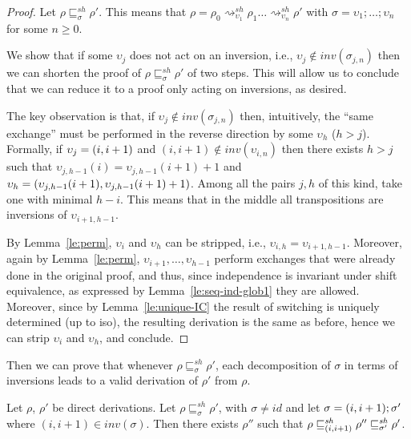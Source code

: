 \documentclass{llncs}
\newcommand{\perm}{\sigma}
\newcommand{\inv}[1]{\ensuremath{inv}({#1})}
\newcommand{\shiftdir}[1][]{\ensuremath{\mathrel{{\rightsquigarrow}^{\mathit{sh}}_{#1}}}}
\newcommand{\shiftpre}[1][]{\ensuremath{\mathrel{{\sqsubseteq}^{\mathit{sh}}_{#1}}}}
\begin{document}
\begin{proof}
  Let $\rho \shiftpre[\perm] \rho'$. This means that
  $\rho = \rho_0 \shiftdir[\upsilon_1] \rho_1 \ldots \shiftdir[\upsilon_n ]
  \rho'$ with $\perm = \upsilon_1; \ldots; \upsilon_n$ for some $n \geq 0$.
  
  We show that if some $\upsilon_j$ does not act on an inversion, i.e.,
  $\upsilon_j \not\in \inv{\sigma_{j,n}}$ then we can shorten the
  proof of $\rho \shiftpre[\sigma] \rho'$ of two steps. This will
  allow us to conclude that we can reduce it to a proof only acting
  on inversions, as desired.

  The key observation is that, if
  $\upsilon_j \not\in \inv{\sigma_{j,n}}$ then, intuitively, the ``same
  exchange'' must be performed in the reverse direction by some
  $\upsilon_h$ ($h>j$).  Formally, if $\upsilon_j = \transp{i}$ and
  $(i,i+1)\not\in\inv{\upsilon_{i,n}}$ then there exists $h>j$ such that
  $\upsilon_{j,h-1}(i) = \upsilon_{j,h-1}(i+1)+1$ and
  $\upsilon_h = \transp{\upsilon_{j,h-1}(i+1)}$. Among all the pairs
  $j, h$ of this kind, take one with minimal $h-i$. This means that in
  the middle all transpositions are inversions of $\upsilon_{i+1,h-1}$.

  By Lemma~\ref{le:perm}, $\upsilon_i$ and $\upsilon_h$ can be
  stripped, i.e., $\upsilon_{i,h} = \upsilon_{i+1,h-1}$. Moreover,
  again by Lemma~\ref{le:perm},
  $\upsilon_{i+1}, \ldots, \upsilon_{h-1}$ perform exchanges that were
  already done in the original proof, and thus, since independence is
  invariant under shift equivalence, as expressed by
  Lemma~\ref{le:seq-ind-glob1} they are allowed. Moreover, since by
  Lemma~\ref{le:unique-IC} the result of switching is uniquely
  determined (up to iso), the resulting derivation is the same as
  before, hence we can strip $\upsilon_{i}$ and $\upsilon_{h}$,
  and conclude.
\end{proof}  

Then we can prove that whenever $\rho \shiftpre[\perm] \rho'$, each
decomposition of $\perm$ in terms of inversions leads to a valid
derivation of $\rho'$ from $\rho$.

\begin{lemma}
  \label{le:seq-ind-glob2}
  Let $\rho$, $\rho'$ be direct derivations. Let
  $\rho \shiftpre[\perm] \rho'$, with $\perm \neq id$ and let
  $\perm = \transp{i}; \perm'$ where $(i,i+1) \in \inv{\perm}$. Then
  there exists $\rho''$ such that
  $\rho \shiftpre[\transp{i}] \rho'' \shiftpre[\perm']
  \rho'$.
\end{lemma}
\end{document}
